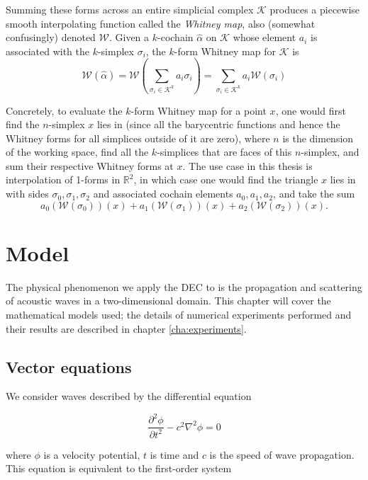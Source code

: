 \documentclass[utf8,english]{gradu3}
\begin{document}
Summing these forms across an entire simplicial complex $\mathcal{K}$
produces a piecewise smooth interpolating function called the \textit{Whitney map},
also (somewhat confusingly) denoted $\mathcal{W}$.
Given a $k$-cochain $\hat{\alpha}$ on $\mathcal{K}$ whose element $a_i$
is associated with the $k$-simplex $\sigma_i$,
the $k$-form Whitney map for $\mathcal{K}$ is
\begin{equation}
  \mathcal{W}(\hat{\alpha})
  = \mathcal{W}(\sum_{\sigma_i \in \mathcal{K}^k} a_i\sigma_i)
  = \sum_{\sigma_i \in \mathcal{K}^k} a_i \mathcal{W}(\sigma_i)
\end{equation}

Concretely, to evaluate the $k$-form Whitney map for a point $x$,
one would first find the $n$-simplex $x$ lies in
(since all the barycentric functions and hence the Whitney forms
for all simplices outside of it are zero),
where $n$ is the dimension of the working space,
find all the $k$-simplices that are faces of this $n$-simplex,
and sum their respective Whitney forms at $x$.
The use case in this thesis is interpolation of 1-forms in $\mathbb{R}^2$,
in which case one would find the triangle $x$ lies in
with sides $\sigma_0,\sigma_1,\sigma_2$
and associated cochain elements $a_0,a_1,a_2$,
and take the sum
\[
  a_0 (\mathcal{W}(\sigma_0))(x)
  + a_1 (\mathcal{W}(\sigma_1))(x)
  + a_2 (\mathcal{W}(\sigma_2))(x).
\]


\chapter{Model}\label{cha:model}

The physical phenomenon we apply the DEC to
is the propagation and scattering of acoustic waves
in a two-dimensional domain.
This chapter will cover the mathematical models used;
the details of numerical experiments performed and their results
are described in chapter \ref{cha:experiments}.


\section{Vector equations}

We consider waves described by the differential equation

\begin{equation}
  \frac{\partial^2 \phi}{\partial t^2} - c^2 \nabla^2\phi = 0
\end{equation}

where $\phi$ is a velocity potential, $t$ is time
and $c$ is the speed of wave propagation.
This equation is equivalent to the first-order system
\end{document}
